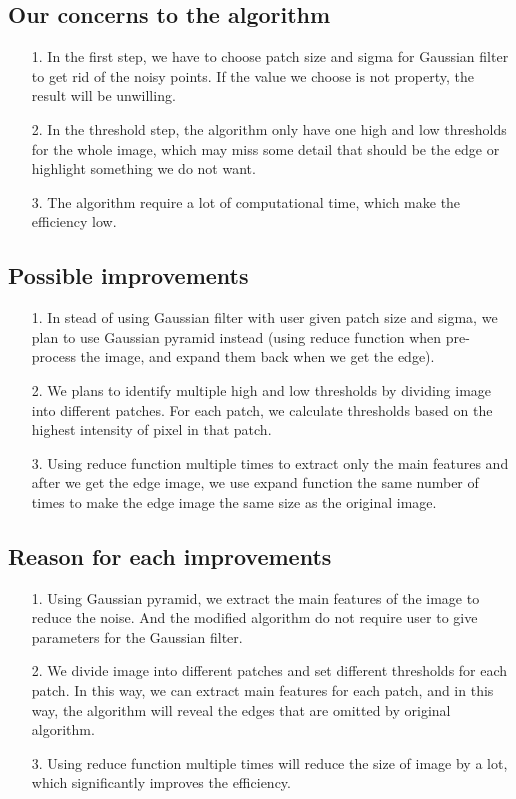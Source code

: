 \documentclass[10pt,twocolumn,letterpaper]{article}
\begin{document}
\subsection{Our concerns to the algorithm}
\begin{enumerate}
	\item[1.] In the first step, we have to choose patch size and sigma for Gaussian filter to get rid of the noisy points. If the value we choose is not property, the result will be unwilling.
	\item[2.] In the threshold step, the algorithm only have one high and low thresholds for the whole image, which may miss some detail that should be the edge or highlight something we do not want.
	\item[3.] The algorithm require a lot of computational time, which make the efficiency low.
\end{enumerate}

\subsection{Possible improvements}
\begin{enumerate}
	\item[1.] In stead of using Gaussian filter with user given patch size and sigma, we plan to use Gaussian pyramid instead (using reduce function when pre-process the image, and expand them back when we get the edge).
	\item[2.] We plans to identify multiple high and low thresholds by dividing image into different patches. For each patch, we calculate thresholds based on the highest intensity of pixel in that patch.
	\item[3.] Using reduce function multiple times to extract only the main features and after we get the edge image, we use expand function the same number of times to make the edge image the same size as the original image.
\end{enumerate}

\subsection{Reason for each improvements}
\begin{enumerate}
	\item[1.] Using Gaussian pyramid, we extract the main features of the image to reduce the noise. And the modified algorithm do not require user to give parameters for the Gaussian filter.
	\item[2.] We divide image into different patches and set different thresholds for each patch. In this way, we can extract main features for each patch, and in this way, the algorithm will reveal the edges that are omitted by original algorithm. 
	\item[3.] Using reduce function multiple times will reduce the size of image by a lot, which significantly improves the efficiency.
\end{enumerate}
\end{document}
